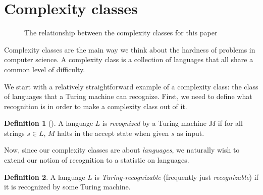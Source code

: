 \documentclass[english,12pt]{reedthesis}
\theoremstyle{plain}
\theoremstyle{definition}
\newtheorem{defn}[defn]{Definition}
\theoremstyle{remark}
\begin{document}
\section{Complexity classes}

\begin{figure}[htbp]
  \centering
  \caption{The relationship between the complexity classes for this
    paper}\label{fig:comp-class}
\end{figure}

Complexity classes are the main way we think about the hardness of problems in
computer science. A complexity class is a collection of
languages that all share a common level of difficulty.

We start with a relatively straightforward example of a complexity class: the
class of languages that a Turing machine can recognize. First, we need to
define what recognition is in order to make a complexity class out of it.

\begin{defn}[{\cite[Def.\ 3.2]{Sip97}}]\label{def:recognition}
  A language $L$ is \emph{recognized} by a Turing machine $M$ if for all strings
  $s \in L$, $M$ halts in the accept state when given $s$ as input.
\end{defn}

Now, since our complexity classes are about \emph{languages}, we naturally wish
to extend our notion of recognition to a statistic on languages.

\begin{defn}\label{def:turing-recognizable}
  A language $L$ is \emph{Turing-recognizable} (frequently just
  \emph{recognizable}) if it is recognized by some Turing machine.
\end{defn}
\end{document}
